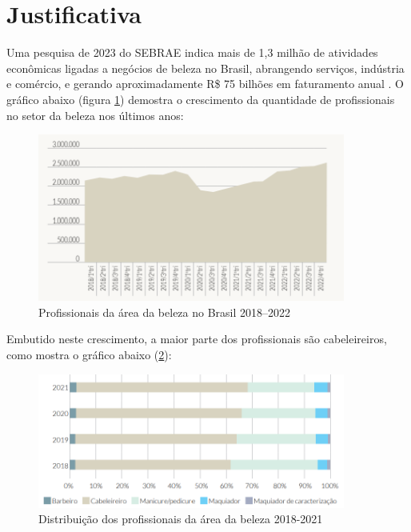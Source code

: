 \section{Justificativa}

Uma pesquisa de 2023 do SEBRAE indica mais de 1,3 milhão de atividades econômicas ligadas a negócios de beleza no Brasil, abrangendo serviços, indústria e comércio, e gerando aproximadamente R\$ 75 bilhões em faturamento anual \cite{sebrae2023forca}. O gráfico abaixo (figura \ref{fig:profissionais_brasil}) demostra o crescimento da quantidade de profissionais no setor da beleza nos últimos anos:

 \begin{figure}[htb]
 	\centering
 	\includegraphics[width=0.9\textwidth]{cap01-Introducao/Images/1.3_grafico_profissionais_brasil}
 	\caption{Profissionais da área da beleza no Brasil 2018–2022}
 	\label{fig:profissionais_brasil}
 \end{figure}
 
 \FloatBarrier
 
Embutido neste crescimento, a maior parte dos profissionais são cabeleireiros, como mostra o gráfico abaixo (\ref{fig:Distribuição_profissionais}):

\begin{figure}[htb]
	\centering
	\includegraphics[width=0.9\textwidth]{cap01-Introducao/Images/1.3_grafico_maioria_cabeleireiros}
	\caption{Distribuição dos profissionais da área da beleza 2018-2021}
	\label{fig:Distribuição_profissionais}
\end{figure}

